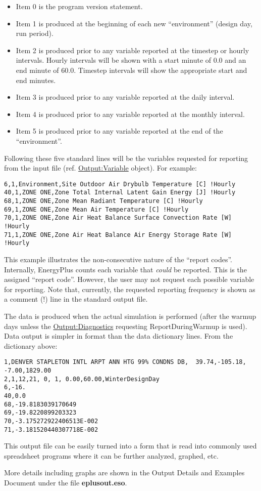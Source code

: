 \begin{itemize}
\item
  Item 0 is the program version statement.
\item
  Item 1 is produced at the beginning of each new ``environment'' (design day, run period).
\item
  Item 2 is produced prior to any variable reported at the timestep or hourly intervals. Hourly intervals will be shown with a start minute of 0.0 and an end minute of 60.0. Timestep intervals will show the appropriate start and end minutes.
\item
  Item 3 is produced prior to any variable reported at the daily interval.
\item
  Item 4 is produced prior to any variable reported at the monthly interval.
\item
  Item 5 is produced prior to any variable reported at the end of the ``environment''.
\end{itemize}

Following these five standard lines will be the variables requested for reporting from the input file (ref. \hyperref[outputvariable]{Output:Variable} object). For example:

\begin{lstlisting}
6,1,Environment,Site Outdoor Air Drybulb Temperature [C] !Hourly
40,1,ZONE ONE,Zone Total Internal Latent Gain Energy [J] !Hourly
68,1,ZONE ONE,Zone Mean Radiant Temperature [C] !Hourly
69,1,ZONE ONE,Zone Mean Air Temperature [C] !Hourly
70,1,ZONE ONE,Zone Air Heat Balance Surface Convection Rate [W] !Hourly
71,1,ZONE ONE,Zone Air Heat Balance Air Energy Storage Rate [W] !Hourly
\end{lstlisting}

This example illustrates the non-consecutive nature of the ``report codes''. Internally, EnergyPlus counts each variable that \emph{could} be reported. This is the assigned ``report code''. However, the user may not request each possible variable for reporting. Note that, currently, the requested reporting frequency is shown as a comment (!) line in the standard output file.

The data is produced when the actual simulation is performed (after the warmup days unless the \hyperref[outputdiagnostics]{Output:Diagnostics} requesting ReportDuringWarmup is used). Data output is simpler in format than the data dictionary lines. From the dictionary above:

\begin{lstlisting}
1,DENVER STAPLETON INTL ARPT ANN HTG 99% CONDNS DB,  39.74,-105.18,  -7.00,1829.00
2,1,12,21, 0, 1, 0.00,60.00,WinterDesignDay
6,-16.
40,0.0
68,-19.8183039170649
69,-19.8220899203323
70,-3.175272922406513E-002
71,-3.181520440307718E-002
\end{lstlisting}

This output file can be easily turned into a form that is read into commonly used spreadsheet programs where it can be further analyzed, graphed, etc.

More details including graphs are shown in the Output Details and Examples Document under the file \textbf{eplusout.eso}.

